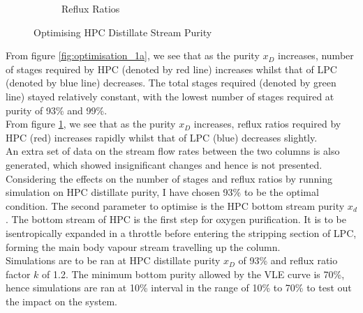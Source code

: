 \begin{figure}[ht]
\begin{subfigure}{0.49\textwidth}
            \caption{Reflux Ratios} \label{fig:optimisation_1b}
        \end{subfigure}
        \caption{Optimising HPC Distillate Stream Purity} \label{fig:optimsation_1}
    \end{figure}
	\noindent From figure \ref{fig:optimisation_1a}, we see that as the purity $x_D$ increases, number of stages required by HPC (denoted by red line) increases whilst that of LPC (denoted by blue line) decreases. The total stages required (denoted by green line) stayed relatively constant, with the lowest number of stages required at purity of 93\% and 99\%. \\
	From figure \ref{fig:optimisation_1b}, we see that as the purity $x_D$ increases, reflux ratios required by HPC (red) increases rapidly whilst that of LPC (blue) decreases slightly. \\
	An extra set of data on the stream flow rates between the two columns is also generated, which showed insignificant changes and hence is not presented.\\
	Considering the effects on the number of stages and reflux ratios by running simulation on HPC distillate purity, I have chosen 93\% to be the optimal condition.
    The second parameter to optimise is the HPC bottom stream purity $x_d$. The bottom stream of HPC is the first step for oxygen purification. It is to be isentropically expanded in a throttle before entering the stripping section of LPC, forming the main body vapour stream travelling up the column. \\
    Simulations are to be ran at HPC distillate purity $x_D$ of 93\% and reflux ratio factor $k$ of 1.2. The minimum bottom purity allowed by the VLE curve is 70\%, hence simulations are ran at 10\% interval in the range of 10\% to 70\% to test out the impact on the system. \\
    
